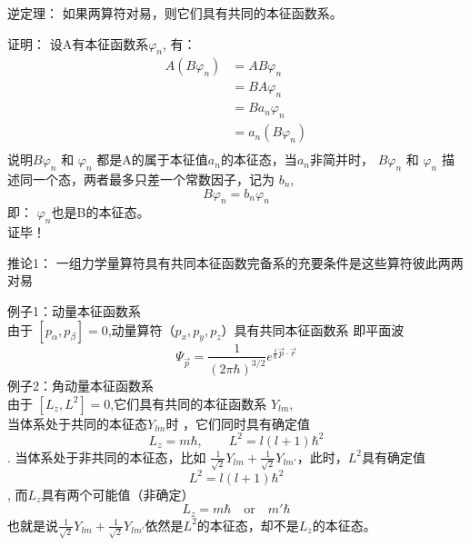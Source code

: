 \begin{frame} [allowframebreaks=]
    \begin{tcolorbox1}{逆定理：}
       如果两算符对易，则它们具有共同的本征函数系。
    \end{tcolorbox1}
    \alert{证明：} 设A有本征函数系{$\varphi_n$}, 有：\\ 
        \begin{equation*}
            \begin{split} 
            A(B\varphi_n)&= AB\varphi_n\\
            &=BA\varphi_n \\
            &=Ba_n\varphi_n \\
            &=a_n(B\varphi_n) \\
            \end{split}  
        \end{equation*}  
        说明$B\varphi_n$ 和 $\varphi_n$ 都是A的属于本征值$a_n$的本征态，当$a_n$非简并时， 
        $B\varphi_n$ 和 $\varphi_n$ 描述同一个态，两者最多只差一个常数因子，记为 $b_n$,
        $$ B\varphi_n=b_n \varphi_n$$
        即： $\varphi_n$也是B的本征态。\\
        证毕！
\end{frame} 

\begin{frame} [allowframebreaks=]
    \begin{tcolorbox1}{推论1：}
        一组力学量算符具有共同本征函数完备系的充要条件是这些算符彼此两两对易
    \end{tcolorbox1}
    \alert{例子1：动量本征函数系} \\
    由于 $[p_\alpha,p_\beta]=0$,动量算符（$p_x, p_y, p_z$）具有共同本征函数系 即平面波\\
    $$ \Psi_{\vec p}= \frac{1}{(2\pi\hbar)^{3/2}} e^{\frac{i}{\hbar}\vec{p}\cdot\vec{r}}$$ 
    \alert{例子2：角动量本征函数系} \\
    由于 $[L_z,L^2]=0$,它们具有共同的本征函数系 {$Y_{lm}$},\\
    当体系处于共同的本征态$Y_{lm}$时 ，它们同时具有确定值
    $$L_z= m\hbar, \qquad L^2=l(l+1)\hbar ^2 $$.
    当体系处于非共同的本征态，比如 $\frac{1}{\sqrt{2}}Y_{lm} + \frac{1}{\sqrt{2}}Y_{lm'}$，此时，$L^2$具有确定值
    $$L^2=l(l+1)\hbar ^2 $$,
    而$L_z$具有两个可能值（非确定）
    $$L_z= m\hbar\quad \text{or} \quad m'\hbar$$
    也就是说$\frac{1}{\sqrt{2}}Y_{lm} + \frac{1}{\sqrt{2}}Y_{lm'}$依然是$L^2$的本征态，却不是$L_z$的本征态。
\end{frame} 

